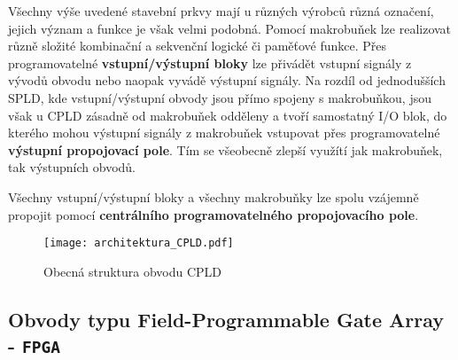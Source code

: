     Všechny výše uvedené stavební prkvy mají u různých výrobců různá označení, jejich význam a
    funkce je však velmi podobná. Pomocí makrobuňek lze realizovat různě složité kombinační a
    sekvenční logické či paměťové funkce. Přes programovatelné \textbf{vstupní/výstupní bloky} lze
    přivádět vstupní signály z vývodů obvodu nebo naopak vyvádě výstupní signály. Na rozdíl od
    jednodušších SPLD, kde vstupní/výstupní obvody jsou přímo spojeny s makrobuňkou, jsou však u
    CPLD zásadně od makrobuňek odděleny a tvoří samostatný I/O blok, do kterého mohou výstupní
    signály z makrobuňek vstupovat přes programovatelné \textbf{výstupní propojovací pole}. Tím se
    všeobecně zlepší využítí jak makrobuňek, tak výstupních obvodů.
    
    Všechny vstupní/výstupní bloky a všechny makrobuňky lze spolu vzájemně propojit pomocí
    \textbf{centrálního programovatelného propojovacího pole}.

        \begin{figure}[ht!]
          \centering
          \texttt{[image: architektura\_CPLD.pdf]}
          \caption[Struktura obvodu CPLD]{Obecná struktura obvodu CPLD}
          \label{PLO:fig_arch_CPLD}
        \end{figure} 
           
  \newpage
  \subsection{Obvody typu Field-Programmable Gate Array - \texttt{FPGA}}   
    \newpage

